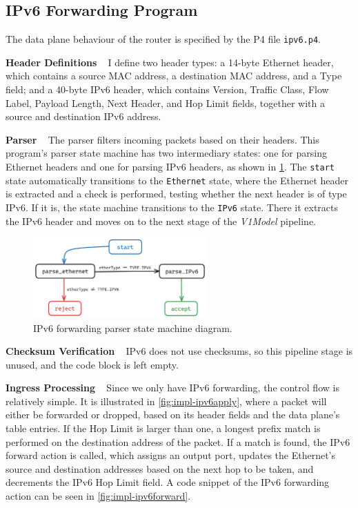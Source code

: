 \subsection{IPv6 Forwarding Program}
\label{sec:3.4.3}

The data plane behaviour of the router is specified by the P4 file \texttt{ipv6.p4}. 

\textbf{Header Definitions} ~ I define two header types: a 14-byte Ethernet header, which contains a source MAC address, a destination MAC address, and a Type field; and a 40-byte IPv6 header, which contains Version, Traffic Class, Flow Label, Payload Length, Next Header, and Hop Limit fields, together with a source and destination IPv6 address.

\textbf{Parser} ~ The parser filters incoming packets based on their headers. This program’s parser state machine has two intermediary states: one for parsing Ethernet headers and one for parsing IPv6 headers, as shown in \cref{fig:impl-ipv6parser}. The \texttt{start} state automatically transitions to the \texttt{Ethernet} state, where the Ethernet header is extracted and a check is performed, testing whether the next header is of type IPv6. If it is, the state machine transitions to the \texttt{IPv6} state. There it extracts the IPv6 header and moves on to the next stage of the \textit{V1Model} pipeline.

\begin{figure}[htbp]
  \centering
    \includegraphics[width=0.6\textwidth]{figures/implementation/ipv6_parser.jpg}
     \caption{IPv6 forwarding parser state machine diagram.}
     \label{fig:impl-ipv6parser}
\end{figure}

\textbf{Checksum Verification} ~ IPv6 does not use checksums, so this pipeline stage is unused, and the code block is left empty.

\textbf{Ingress Processing} ~ Since we only have IPv6 forwarding, the control flow is relatively simple. It is illustrated in \cref{fig:impl-ipv6apply}, where a packet will either be forwarded or dropped, based on its header fields and the data plane's table entries. If the Hop Limit is larger than one, a longest prefix match is performed on the destination address of the packet. If a match is found, the IPv6 forward action is called, which assigns an output port, updates the Ethernet’s source and destination addresses based on the next hop to be taken, and decrements the IPv6 Hop Limit field. A code snippet of the IPv6 forwarding action can be seen in \cref{fig:impl-ipv6forward}.

